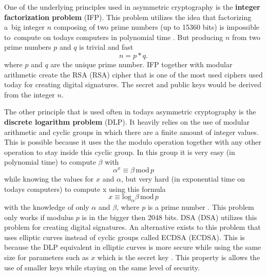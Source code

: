 One of the underlying principles used in asymmetric cryptography is the \textbf{integer factorization problem} (\acs{IFP}). This problem utilizes the idea that factorizing a~big integer $n$ composing of two prime numbers (up to 15360 bits) is impossible to~compute on todays computers in polynomial time \cite{Paar2010}. But producing $n$ from two prime numbers $p$ and $q$ is trivial and fast
\begin{equation}
  n=p*q.
\end{equation}
where $p$ and $q$ are the unique prime number. IFP together with modular arithmetic create the RSA (\acl{RSA}) cipher that is one of the most used ciphers used today for creating digital signatures. The secret and public keys would be derived from the integer $n$.

The other principle that is used often in todays asymmetric cryptography is the \textbf{discrete logarithm problem} (\acs{DLP}). It heavily relies on the use of modular arithmetic and cyclic groups in which there are a finite amount of integer values. This is possible because it uses the the modulo operation together with any other operation to stay inside this cyclic group. In this group it is very easy (in polynomial time) to compute $\beta$ with
\begin{equation}
  \alpha^x\equiv\beta\,\mathrm{mod}\,p
\end{equation}
while knowing the values for $x$ and $\alpha$, but very hard (in exponential time on todays computers) to compute x using this formula
\begin{equation}
  x\equiv\mathrm{log}_\alpha\beta\,\mathrm{mod}\,p
\end{equation}
with the knowledge of only $\alpha$ and $\beta$, where $p$ is a prime number \cite{Paar2010}. This problem only works if modulus $p$ is in the bigger then 2048 bits. DSA (\acl{DSA}) utilizes this problem for creating digital signatures. An alternative exists to this problem that uses elliptic curves instead of cyclic groups called ECDSA (\acl{ECDSA}). This is because the DLP equivalent in elliptic curves is more secure while using the same size for parameters such as $x$ which is the secret key \cite{Ristic2014}. This property is allows the use of smaller keys while staying on the same level of security.
